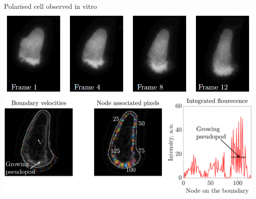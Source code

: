 \documentclass[mathserif,11pt]{beamer}
\begin{document}
\begin{frame}{Polarised cell observed in vitro}
\centering
\includegraphics[scale=0.385]{Figures/in_vitro_cell.png}
\vfil
\includegraphics[scale=0.195]{Figures/normally_polarised_t9.png}
\end{frame}
\end{document}
